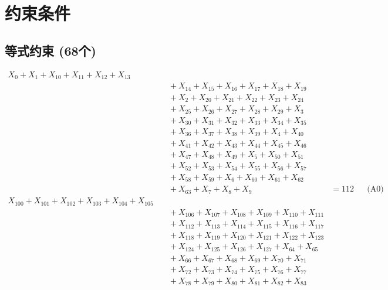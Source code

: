 \documentclass[a4paper,10pt]{article}
\begin{document}
\section{约束条件}

\subsection{等式约束 (68个)}

\allowdisplaybreaks
{\small\begin{align}
X_{0} + X_{1} + X_{10} + X_{11} + X_{12} + X_{13} \\[0.5ex]
&\quad  + X_{14} + X_{15} + X_{16} + X_{17} + X_{18} + X_{19} \\[0.5ex]
&\quad  + X_{2} + X_{20} + X_{21} + X_{22} + X_{23} + X_{24} \\[0.5ex]
&\quad  + X_{25} + X_{26} + X_{27} + X_{28} + X_{29} + X_{3} \\[0.5ex]
&\quad  + X_{30} + X_{31} + X_{32} + X_{33} + X_{34} + X_{35} \\[0.5ex]
&\quad  + X_{36} + X_{37} + X_{38} + X_{39} + X_{4} + X_{40} \\[0.5ex]
&\quad  + X_{41} + X_{42} + X_{43} + X_{44} + X_{45} + X_{46} \\[0.5ex]
&\quad  + X_{47} + X_{48} + X_{49} + X_{5} + X_{50} + X_{51} \\[0.5ex]
&\quad  + X_{52} + X_{53} + X_{54} + X_{55} + X_{56} + X_{57} \\[0.5ex]
&\quad  + X_{58} + X_{59} + X_{6} + X_{60} + X_{61} + X_{62} \\[0.5ex]
&\quad  + X_{63} + X_{7} + X_{8} + X_{9} &= 112 && \text{(A0)} \\
X_{100} + X_{101} + X_{102} + X_{103} + X_{104} + X_{105} \\[0.5ex]
&\quad  + X_{106} + X_{107} + X_{108} + X_{109} + X_{110} + X_{111} \\[0.5ex]
&\quad  + X_{112} + X_{113} + X_{114} + X_{115} + X_{116} + X_{117} \\[0.5ex]
&\quad  + X_{118} + X_{119} + X_{120} + X_{121} + X_{122} + X_{123} \\[0.5ex]
&\quad  + X_{124} + X_{125} + X_{126} + X_{127} + X_{64} + X_{65} \\[0.5ex]
&\quad  + X_{66} + X_{67} + X_{68} + X_{69} + X_{70} + X_{71} \\[0.5ex]
&\quad  + X_{72} + X_{73} + X_{74} + X_{75} + X_{76} + X_{77} \\[0.5ex]
&\quad  + X_{78} + X_{79} + X_{80} + X_{81} + X_{82} + X_{83} \\[0.5ex]

\end{align}}
\end{document}
